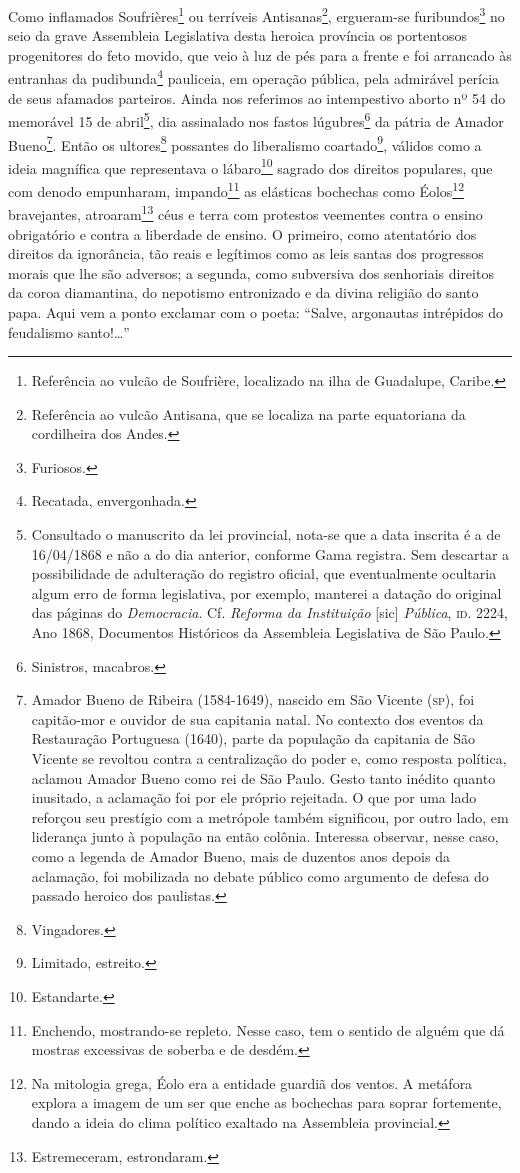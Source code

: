 Como inflamados Soufrières\footnote{Referência ao vulcão de Soufrière,
  localizado na ilha de Guadalupe, Caribe.} ou terríveis
Antisanas\footnote{Referência ao vulcão Antisana, que se localiza na
  parte equatoriana da cordilheira dos Andes.}, ergueram-se
furibundos\footnote{Furiosos.} no seio da grave Assembleia Legislativa
desta heroica província os portentosos progenitores do feto movido, que
veio à luz de pés para a frente e foi arrancado às entranhas da
pudibunda\footnote{Recatada, envergonhada.} pauliceia, em operação
pública, pela admirável perícia de seus afamados parteiros. Ainda nos
referimos ao intempestivo aborto nº 54 do memorável 15 de
abril\footnote{Consultado o manuscrito da lei provincial, nota-se que
  a data inscrita é a de 16/04/1868 e não a do dia anterior, conforme
  Gama registra. Sem descartar a possibilidade de adulteração do
  registro oficial, que eventualmente ocultaria algum erro de forma
  legislativa, por exemplo, manterei a datação do original das páginas
  do \emph{Democracia}. Cf. \emph{Reforma da Instituição} {[}sic{]}
  \emph{Pública}, \textsc{id}. 2224, Ano 1868, Documentos Históricos da
  Assembleia Legislativa de São Paulo.}, dia assinalado nos fastos
lúgubres\footnote{Sinistros, macabros.} da pátria de Amador
Bueno\footnote{Amador Bueno de Ribeira (1584-1649), nascido em São
  Vicente (\textsc{sp}), foi capitão-mor e ouvidor de sua capitania natal. No
  contexto dos eventos da Restauração Portuguesa (1640), parte da
  população da capitania de São Vicente se revoltou contra a
  centralização do poder e, como resposta política, aclamou Amador Bueno
  como rei de São Paulo. Gesto tanto inédito quanto inusitado, a
  aclamação foi por ele próprio rejeitada. O que por uma lado reforçou
  seu prestígio com a metrópole também significou, por outro lado, em
  liderança junto à população na então colônia. Interessa observar,
  nesse caso, como a legenda de Amador Bueno, mais de duzentos anos
  depois da aclamação, foi mobilizada no debate público como argumento
  de defesa do passado heroico dos paulistas.}. Então os
ultores\footnote{Vingadores.} possantes do liberalismo
coartado\footnote{Limitado, estreito.}, válidos como a ideia magnífica
que representava o lábaro\footnote{Estandarte.} sagrado dos direitos
populares, que com denodo empunharam, impando\footnote{Enchendo,
  mostrando-se repleto. Nesse caso, tem o sentido de alguém que dá
  mostras excessivas de soberba e de desdém.} as elásticas bochechas
como Éolos\footnote{Na mitologia grega, Éolo era a entidade guardiã
  dos ventos. A metáfora explora a imagem de um ser que enche as
  bochechas para soprar fortemente, dando a ideia do clima político
  exaltado na Assembleia provincial.} bravejantes, atroaram\footnote{
  Estremeceram, estrondaram.} céus e terra com protestos veementes
contra o ensino obrigatório e contra a liberdade de ensino. O primeiro,
como atentatório dos direitos da ignorância, tão reais e legítimos como
as leis santas dos progressos morais que lhe são adversos; a segunda,
como subversiva dos senhoriais direitos da coroa diamantina, do
nepotismo entronizado e da divina religião do santo papa. Aqui vem a
ponto exclamar com o poeta: ``Salve, argonautas intrépidos do feudalismo
santo!\ldots{}''

